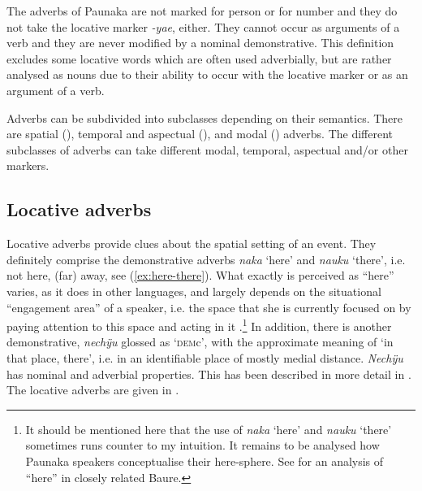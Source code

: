 The adverbs of Paunaka are not marked for person or for number and they do not take the locative marker \textit{-yae}, either. They cannot occur as arguments of a verb and they are never modified by a nominal demonstrative. This definition excludes some locative words which are often used adverbially, but are rather analysed as nouns due to their ability to occur with the locative marker or as an argument of a verb. %

\hspace*{-1.3pt}Adverbs can be subdivided into subclasses depending on their semantics. There are spatial (), temporal and aspectual (), and modal () adverbs. The different subclasses of adverbs can take different modal, temporal, aspectual and/or other markers.



\subsection{Locative adverbs}\label{sec:LocativeAdverbs}

\largerpage
Locative adverbs provide clues about the spatial setting of an event. They definitely comprise the demonstrative adverbs \textit{naka} ‘here’ and \textit{nauku} ‘there’, i.e. not here, (far) away, see (\ref{ex:here-there}). What exactly is perceived as “here” varies, as it does in other languages, and largely depends on the situational “engagement area” of a speaker, i.e. the space that she is currently focused on by paying attention to this space and acting in it \citep[cf.][89]{Enfield2003}.\footnote{It should be mentioned here that the use of \textit{naka} ‘here’ and \textit{nauku} ‘there’ sometimes runs counter to my intuition. It remains to be analysed how Paunaka speakers conceptualise their here-sphere. See \citet[251--257]{Admiraal2016} for an analysis of “here” in closely related Baure.}  In addition, there is another demonstrative, \textit{nechÿu} glossed as ‘\textsc{dem}c’, with the approximate meaning of ‘in that place, there’, i.e. in an identifiable place of mostly medial distance. \textit{Nechÿu} has nominal and adverbial properties. This has been described in more detail in . The locative adverbs are given in .

